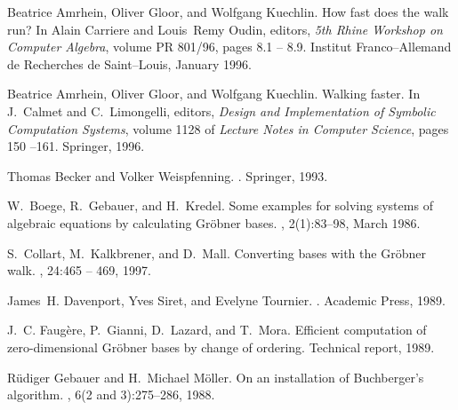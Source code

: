 \begin{thebibliography}{999}
Beatrice Amrhein, Oliver Gloor, and Wolfgang Kuechlin.
\newblock How fast does the walk run?
\newblock In Alain Carriere and Louis~Remy Oudin, editors, {\em 5th Rhine
  Workshop on Computer Algebra}, volume PR 801/96, pages 8.1 -- 8.9. Institut
  Franco--Allemand de Recherches de Saint--Louis, January 1996.

Beatrice Amrhein, Oliver Gloor, and Wolfgang Kuechlin.
\newblock Walking faster.
\newblock In J.~Calmet and C.~Limongelli, editors, {\em Design and
  Implementation of Symbolic Computation Systems}, volume 1128 of {\em Lecture
  Notes in Computer Science}, pages 150 --161. Springer, 1996.

Thomas Becker and Volker Weispfenning.
.
\newblock Springer, 1993.

W.~Boege, R.~Gebauer, and H.~Kredel.
\newblock Some examples for solving systems of algebraic equations by
  calculating {G}r{\"o}bner bases.
, 2(1):83--98, March 1986.



S.~Collart, M.~Kalkbrener, and D.~Mall.
\newblock Converting bases with the {G}r\"obner walk.
, 24:465 -- 469, 1997.

James~H. Davenport, Yves Siret, and Evelyne Tournier.
.
\newblock Academic Press, 1989.

J.~C. Faug{\`e}re, P.~Gianni, D.~Lazard, and T.~Mora.
\newblock Efficient computation of zero-dimensional {G}r\"obner bases by change
  of ordering.
\newblock Technical report, 1989.

R{\"u}diger Gebauer and H.~Michael M{\"o}ller.
\newblock On an installation of {B}uchberger's algorithm.
, 6(2 and 3):275--286, 1988.


\end{thebibliography}
